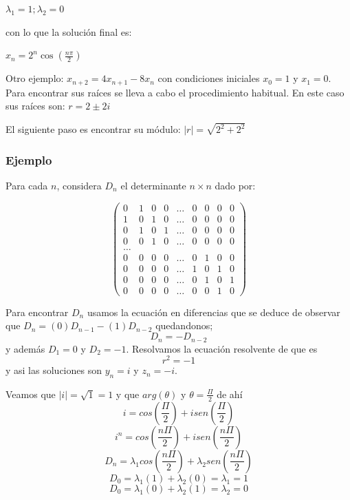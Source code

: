 \documentclass{article}
\begin{document}
$\lambda_1=1;\lambda_2=0$

con lo que la solución final es:

$x_n=2^n\cos(\frac{n\pi}{2})$

Otro ejemplo: $x_{n+2}=4x_{n+1}-8x_n$ con condiciones iniciales
$x_0=1$ y $x_1=0$. Para encontrar sus raíces se lleva a cabo el
procedimiento habitual. En este caso sus raíces son: $r=2\pm2i$

El siguiente paso es encontrar su módulo: $|r|=\sqrt{2^2+2^2}$


\subsubsection{Ejemplo}

Para cada $n$, considera $D_{n}$ el determinante $n\times n$ dado por:

\begin{equation*}
\begin{pmatrix}
0 & 1 & 0 & 0 &\ldots & 0 & 0 & 0 & 0\\
1 & 0 & 1 & 0 &\ldots & 0 & 0 & 0 & 0\\
0 & 1 & 0 & 1 &\ldots & 0 & 0 & 0 & 0\\
0 & 0 & 1 & 0 &\ldots & 0 & 0 & 0 & 0\\
\ldots\\
0 & 0 & 0 & 0 &\ldots & 0 & 1 & 0 & 0\\
0 & 0 & 0 & 0 &\ldots & 1 & 0 & 1 & 0\\
0 & 0 & 0 & 0 &\ldots & 0 & 1 & 0 & 1\\
0 & 0 & 0 & 0 &\ldots & 0 & 0 & 1 & 0
\end{pmatrix}
\end{equation*}


Para encontrar $D_{n}$ usamos la ecuación en diferencias que se deduce de observar
que $D_{n}=(0)D_{n-1}-(1)D_{n-2}$ quedandonos;
\begin{equation}
  \label{determinante}
D_{n}=-D_{n-2}
\end{equation}
 y además $D_{1}=0$ y $D_{2}=-1$.
Resolvamos la ecuación resolvente de que es $$r^{2}=-1$$ y asi las soluciones son $y_{n}=i$ y  $z_{n}=-i$.


Veamos que  $|i|=\sqrt{1}=1$ y que $arg(\theta)$ y $\theta= \frac{\Pi}{2}$ de ahí
  $$i=cos(\frac{\Pi}{2})+isen(\frac{\Pi}{2})$$
  $$i^n=cos(\frac{n\Pi}{2})+isen(\frac{n\Pi}{2})$$
  $$D_{n}=\lambda_{1}cos(\frac{n\Pi}{2})+\lambda_{2}sen(\frac{n\Pi}{2})$$
  $$D_{0}=\lambda_{1}(1)+\lambda_{2}(0)=\lambda_{1}=1$$
  $$D_{0}=\lambda_{1}(0)+\lambda_{2}(1)=\lambda_{2}=0$$
\end{document}
